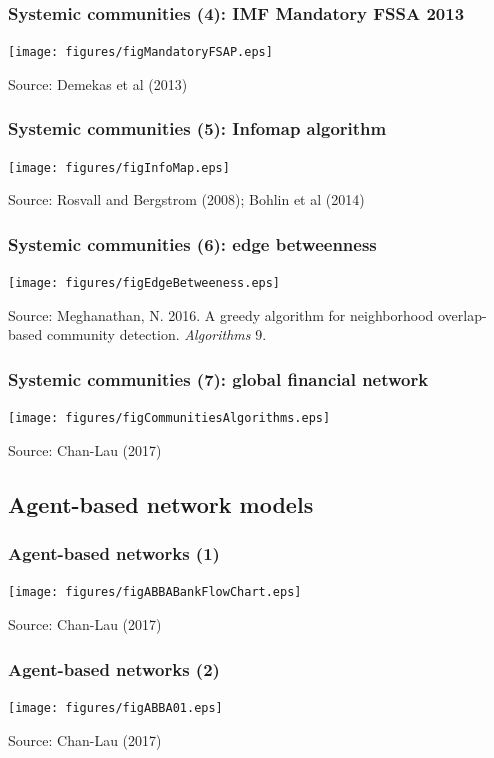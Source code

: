 \documentclass[aspectratio=43,dvipsnames,usenames, svgnames]{beamer}
\begin{document}
\begin{frame} %
\frametitle{Systemic communities (4): IMF Mandatory FSSA 2013}
\begin{center}
	\texttt{[image: figures/figMandatoryFSAP.eps]}
\end{center}
\tiny{Source: Demekas et al (2013)}
\end{frame}

\begin{frame} %
\frametitle{Systemic communities (5): Infomap algorithm}
\begin{center}
	\texttt{[image: figures/figInfoMap.eps]}
\end{center}
\tiny{Source: Rosvall and Bergstrom (2008); Bohlin et al (2014)}
\end{frame}

\begin{frame} %
\frametitle{Systemic communities (6): edge betweenness}
\begin{center}
	\texttt{[image: figures/figEdgeBetweeness.eps]}
\end{center}
\tiny{Source: Meghanathan, N. 2016. A greedy algorithm for neighborhood overlap-based community detection. \textit{Algorithms}} 9.
\end{frame}

\begin{frame} %
\frametitle{Systemic communities (7): global financial network}
\begin{center}%
	\texttt{[image: figures/figCommunitiesAlgorithms.eps]}
\end{center}
\tiny{Source: Chan-Lau (2017)}
\end{frame}

\subsection{Agent-based network models} 

\begin{frame} %
\begin{center}
\frametitle{Agent-based networks (1)}
	\texttt{[image: figures/figABBABankFlowChart.eps]}
\end{center}
\tiny{Source: Chan-Lau (2017)}
\end{frame}

\begin{frame} %
\begin{center}
\frametitle{Agent-based networks (2)}
	\texttt{[image: figures/figABBA01.eps]}
\end{center}
\tiny{Source: Chan-Lau (2017)}
\end{frame}
\end{document}
